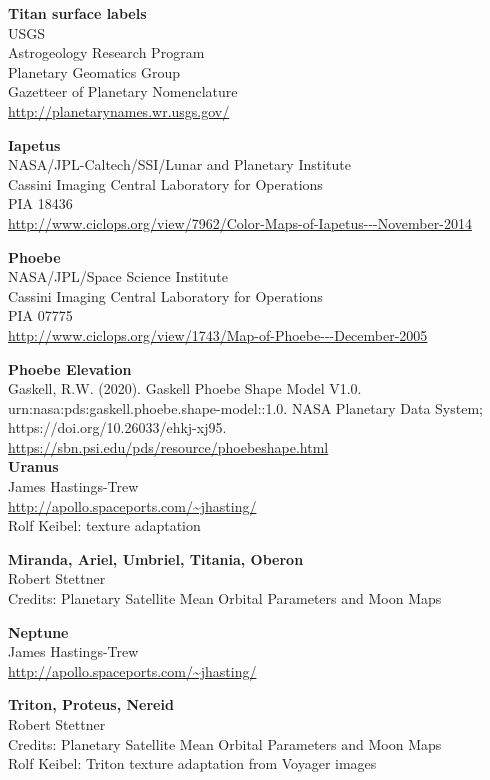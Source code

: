\documentclass[Orbiter User Manual.tex]{subfiles}
\begin{document}
\textbf{Titan surface labels}\\
USGS\\
Astrogeology Research Program\\
Planetary Geomatics Group\\
Gazetteer of Planetary Nomenclature\\
\url{http://planetarynames.wr.usgs.gov/}

\textbf{Iapetus}\\
NASA/JPL-Caltech/SSI/Lunar and Planetary Institute\\
Cassini Imaging Central Laboratory for Operations\\
PIA 18436\\
\url{http://www.ciclops.org/view/7962/Color-Maps-of-Iapetus---November-2014}

\textbf{Phoebe}\\
NASA/JPL/Space Science Institute\\
Cassini Imaging Central Laboratory for Operations\\
PIA 07775\\
\url{http://www.ciclops.org/view/1743/Map-of-Phoebe---December-2005}

\textbf{Phoebe Elevation}\\
Gaskell, R.W. (2020). Gaskell Phoebe Shape Model V1.0. urn:nasa:pds:gaskell.phoebe.shape-model::1.0. NASA Planetary Data System; https://doi.org/10.26033/ehkj-xj95.
\url{https://sbn.psi.edu/pds/resource/phoebeshape.html}\\

\textbf{Uranus}\\
James Hastings-Trew\\
\url{http://apollo.spaceports.com/~jhasting/}\\
Rolf Keibel: texture adaptation

\textbf{Miranda, Ariel, Umbriel, Titania, Oberon}\\
Robert Stettner\\
Credits: Planetary Satellite Mean Orbital Parameters and Moon Maps

\textbf{Neptune}\\
James Hastings-Trew\\
\url{http://apollo.spaceports.com/~jhasting/}

\textbf{Triton, Proteus, Nereid}\\
Robert Stettner\\
Credits: Planetary Satellite Mean Orbital Parameters and Moon Maps\\
Rolf Keibel: Triton texture adaptation from Voyager images
\end{document}
